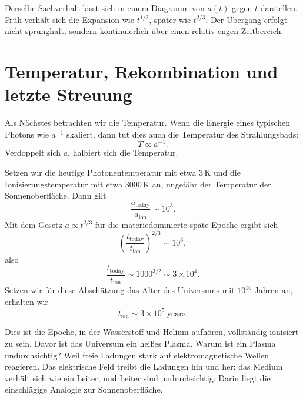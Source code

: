 Derselbe Sachverhalt lässt sich in einem Diagramm von \(a(t)\) gegen \(t\) darstellen. Früh verhält sich die Expansion wie \(t^{1/2}\), später wie \(t^{2/3}\). Der Übergang erfolgt nicht sprunghaft, sondern kontinuierlich über einen relativ engen Zeitbereich.

\begin{classroomqa}\end{classroomqa}

\section{Temperatur, Rekombination und letzte Streuung}

Als Nächstes betrachten wir die Temperatur. Wenn die Energie eines typischen Photons wie \(a^{-1}\) skaliert, dann tut dies auch die Temperatur des Strahlungsbads:
\begin{equation}
T\propto a^{-1}.
\end{equation}
Verdoppelt sich \(a\), halbiert sich die Temperatur.

Setzen wir die heutige Photonentemperatur mit etwa \(3\,\mathrm K\) und die Ionisierungstemperatur mit etwa \(3000\,\mathrm K\) an, ungefähr der Temperatur der Sonnenoberfläche. Dann gilt
\begin{equation}
\frac{a_{\mathrm{today}}}{a_{\mathrm{ion}}}\sim 10^3.
\end{equation}
Mit dem Gesetz \(a\propto t^{2/3}\) für die materiedominierte späte Epoche ergibt sich
\begin{equation}
\left(\frac{t_{\mathrm{today}}}{t_{\mathrm{ion}}}\right)^{2/3}\sim 10^3,
\end{equation}
also
\begin{equation}
\frac{t_{\mathrm{today}}}{t_{\mathrm{ion}}}\sim 1000^{3/2}\sim 3\times 10^4.
\end{equation}
Setzen wir für diese Abschätzung das Alter des Universums mit \(10^{10}\) Jahren an, erhalten wir
\begin{equation}
t_{\mathrm{ion}}\sim 3\times 10^5\ \mathrm{years}.
\end{equation}

Dies ist die Epoche, in der Wasserstoff und Helium aufhören, vollständig ionisiert zu sein. Davor ist das Universum ein heißes Plasma. Warum ist ein Plasma undurchsichtig? Weil freie Ladungen stark auf elektromagnetische Wellen reagieren. Das elektrische Feld treibt die Ladungen hin und her; das Medium verhält sich wie ein Leiter, und Leiter sind undurchsichtig. Darin liegt die einschlägige Analogie zur Sonnenoberfläche.

